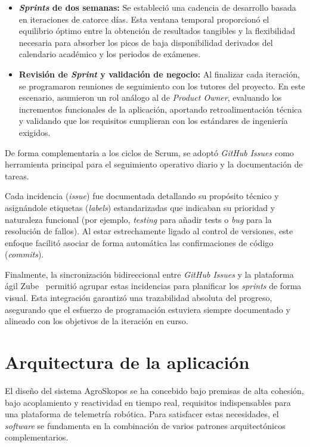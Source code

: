 \begin{itemize}
    \item \textbf{\textit{Sprints} de dos semanas:} Se estableció una cadencia de desarrollo basada en iteraciones de catorce días. Esta ventana temporal proporcionó el equilibrio óptimo entre la obtención de resultados tangibles y la flexibilidad necesaria para absorber los picos de baja disponibilidad derivados del calendario académico y los periodos de exámenes.
    \item \textbf{Revisión de \textit{Sprint} y validación de negocio:} Al finalizar cada iteración, se programaron reuniones de seguimiento con los tutores del proyecto. En este escenario, asumieron un rol análogo al de \textit{Product Owner}, evaluando los incrementos funcionales de la aplicación, aportando retroalimentación técnica y validando que los requisitos cumplieran con los estándares de ingeniería exigidos.
\end{itemize}

De forma complementaria a los ciclos de Scrum, se adoptó \textit{GitHub Issues} como herramienta principal para el seguimiento operativo diario y la documentación de tareas.

Cada incidencia (\textit{issue}) fue documentada detallando su propósito técnico y asignándole etiquetas (\textit{labels}) estandarizadas que indicaban su prioridad y naturaleza funcional (por ejemplo, \textit{testing} para añadir tests o \textit{bug} para la resolución de fallos). Al estar estrechamente ligado al control de versiones, este enfoque facilitó asociar de forma automática las confirmaciones de código (\textit{commits}).

Finalmente, la sincronización bidireccional entre \textit{GitHub Issues} y la plataforma ágil Zube~\cite{zube} permitió agrupar estas incidencias para planificar los \textit{sprints} de forma visual. Esta integración garantizó una trazabilidad absoluta del progreso, asegurando que el esfuerzo de programación estuviera siempre documentado y alineado con los objetivos de la iteración en curso.


\section{Arquitectura de la aplicación}

El diseño del sistema AgroSkopos se ha concebido bajo premisas de alta cohesión, bajo acoplamiento y reactividad en tiempo real, requisitos indispensables para una plataforma de telemetría robótica. Para satisfacer estas necesidades, el \textit{software} se fundamenta en la combinación de varios patrones arquitectónicos complementarios.

